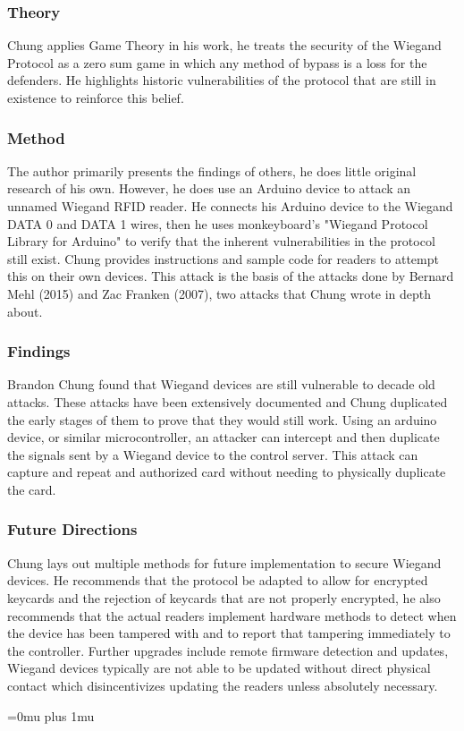 \subsubsection{Theory}

\noindent
Chung applies Game Theory in his work, he treats the security of the Wiegand Protocol as a zero sum game in which any method of bypass is a loss for the defenders.  He highlights historic vulnerabilities of the protocol that are still in existence to reinforce this belief.

\subsubsection{Method}

\noindent
The author primarily presents the findings of others, he does little original research of his own.  However, he does use an Arduino device to attack an unnamed Wiegand RFID reader.  He connects his Arduino device to the Wiegand DATA 0 and DATA 1 wires, then he uses monkeyboard's "Wiegand Protocol Library for Arduino" to verify that the inherent vulnerabilities in the protocol still exist.  Chung provides instructions and sample code for readers to attempt this on their own devices. This attack is the basis of the attacks done by Bernard Mehl (2015) and Zac Franken (2007), two attacks that Chung wrote in depth about.

\subsubsection{Findings}

\noindent
Brandon Chung found that Wiegand devices are still vulnerable to decade old attacks.  These attacks have been extensively documented and Chung duplicated the early stages of them to prove that they would still work.  Using an arduino device, or similar microcontroller, an attacker can intercept and then duplicate the signals sent by a Wiegand device to the control server. This attack can capture and repeat and authorized card without needing to physically duplicate the card.

\subsubsection{Future Directions}

\noindent
Chung lays out multiple methods for future implementation to secure Wiegand devices.  He recommends that the protocol be adapted to allow for encrypted keycards and the rejection of keycards that are not properly encrypted, he also recommends that the actual readers implement hardware methods to detect when the device has been tampered with and to report that tampering immediately to the controller.  Further upgrades include remote firmware detection and updates, Wiegand devices typically are not able to be updated without direct physical contact which disincentivizes updating the readers unless absolutely necessary.

\Urlmuskip=0mu plus 1mu\relax

\pagebreak